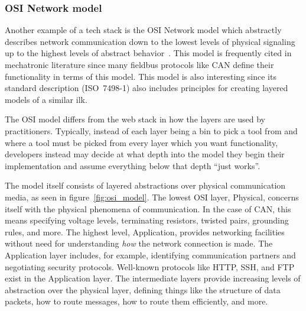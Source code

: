 \documentclass[english,12pt,a4paper,pdftex,eng,utf8]{aaltothesis}
\begin{document}
\subsubsection{OSI Network model}

Another example of a tech stack is the OSI Network model which abstractly describes network communication down to the lowest levels of physical signaling up to the highest levels of abstract behavior~\cite{ISO7498-1}. This model is frequently cited in mechatronic literature since many fieldbus protocols like CAN define their functionality in terms of this model. This model is also interesting since its standard description (ISO~7498-1) also includes principles for creating layered models of a similar ilk.

The OSI model differs from the web stack in how the layers are used by practitioners. Typically, instead of each layer being a bin to pick a tool from and where a tool must be picked from every layer which you want functionality, developers instead may decide at what depth into the model they begin their implementation and assume everything below that depth ``just works''.

The model itself consists of layered abstractions over physical communication media, as seen in figure~\ref{fig:osi_model}. The lowest OSI layer, Physical, concerns itself with the physical phenomena of communication. In the case of CAN, this means specifying voltage levels, terminating resistors, twisted pairs, grounding rules, and more. The highest level, Application, provides networking facilities without need for understanding \textit{how} the network connection is made. The Application layer includes, for example, identifying communication partners and negotiating security protocols. Well-known protocols like HTTP, SSH, and FTP exist in the Application layer. The intermediate layers provide increasing levels of abstraction over the physical layer, defining things like the structure of data packets, how to route messages, how to route them efficiently, and more.
\end{document}
